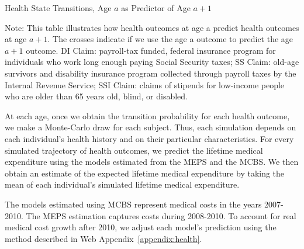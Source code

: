 \begin{table}
\begin{threeparttable}
\caption{Health State Transitions, Age $a$ as Predictor of Age $a+1$}\label{table:transition}
\tiny

\begin{tablenotes}
\footnotesize
\item Note: This table illustrates how health outcomes at age a predict health outcomes at age $a + 1$. The crosses indicate if we use the age a outcome to predict the age $a + 1$ outcome. DI Claim: payroll-tax funded, federal insurance program for individuals who work long enough paying Social Security taxes; SS Claim: old-age survivors and disability insurance program collected through payroll taxes by the Internal Revenue Service; SSI Claim: claims of stipends for low-income people who are older than 65 years old, blind, or disabled.
\end{tablenotes}
\end{threeparttable}
\end{table}

At each age, once we obtain the transition probability for each health outcome, we make a Monte-Carlo draw for each subject. Thus, each simulation depends on each individual's health history and on their particular characteristics. For every simulated trajectory of health outcomes, we predict the lifetime medical expenditure using the models estimated from the MEPS and the MCBS. We then obtain an estimate of the expected lifetime medical expenditure by taking the mean of each individual's simulated lifetime medical expenditure.

The models estimated using MCBS represent medical costs in the years 2007-2010. The MEPS estimation captures costs during 2008-2010. To account for real medical cost growth after 2010, we adjust each model's prediction using the method described in Web Appendix~\ref{appendix:health}.

